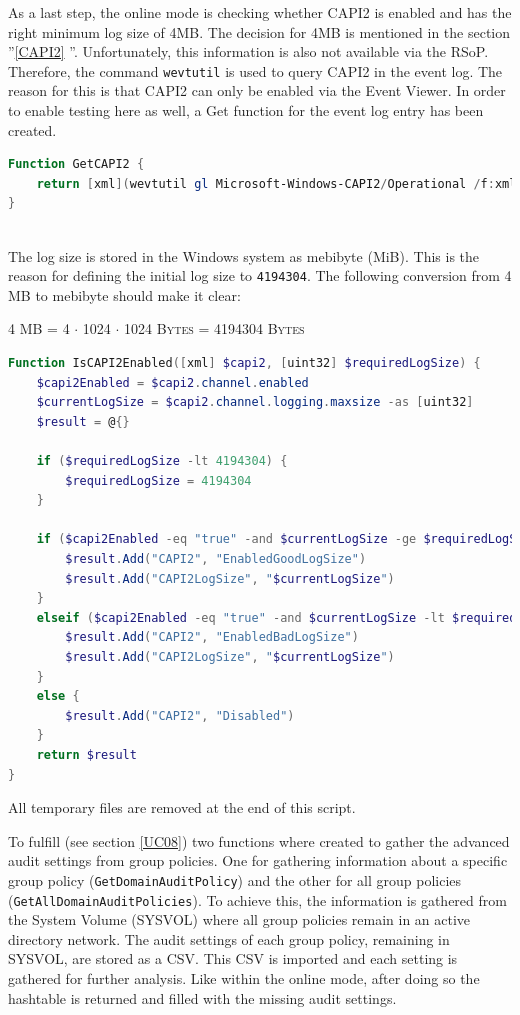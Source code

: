 \clearpage

As a last step, the online mode is checking whether CAPI2 is enabled and has the right minimum log size of 4MB. The decision for 4MB is mentioned in the section ''\ref{CAPI2} ''. Unfortunately, this information is also not available via the RSoP. Therefore, the command \lstinline|wevtutil| is used to query CAPI2 in the event log. The reason for this is that CAPI2 can only be enabled via the Event Viewer. \cite{CAPI2} In order to enable testing here as well, a Get function for the event log entry has been created.

\begin{lstlisting}[caption=Function GetCAPI2, language=PowerShell]
Function GetCAPI2 {
    return [xml](wevtutil gl Microsoft-Windows-CAPI2/Operational /f:xml)
}
\end{lstlisting}\ \\
The log size is stored in the Windows system as mebibyte (MiB). This is the reason for defining the initial log size to \lstinline|4194304|. The following conversion from 4 MB to mebibyte should make it clear:
\begin{center}
    \textsc{4 MB = 4 $\cdot$ 1024 $\cdot$ 1024 Bytes = 4194304 Bytes }
\end{center}
\begin{lstlisting}[caption=Function IsCAPI2Enabled, language=PowerShell]
Function IsCAPI2Enabled([xml] $capi2, [uint32] $requiredLogSize) {
    $capi2Enabled = $capi2.channel.enabled
    $currentLogSize = $capi2.channel.logging.maxsize -as [uint32]
    $result = @{}

    if ($requiredLogSize -lt 4194304) {
        $requiredLogSize = 4194304
    }

    if ($capi2Enabled -eq "true" -and $currentLogSize -ge $requiredLogSize) {
        $result.Add("CAPI2", "EnabledGoodLogSize")
        $result.Add("CAPI2LogSize", "$currentLogSize")
    }
    elseif ($capi2Enabled -eq "true" -and $currentLogSize -lt $requiredLogSize) {
        $result.Add("CAPI2", "EnabledBadLogSize")
        $result.Add("CAPI2LogSize", "$currentLogSize")
    }
    else {
        $result.Add("CAPI2", "Disabled")
    }
    return $result
}  
\end{lstlisting}
All temporary files are removed at the end of this script.
\clearpage

To fulfill  (see section \ref{UC08}) two functions where created to gather the advanced audit settings from group policies. One for gathering information about a specific group policy (\lstinline|GetDomainAuditPolicy|) and the other for all group policies (\lstinline|GetAllDomainAuditPolicies|). To achieve this, the information is gathered from the System Volume (SYSVOL) where all group policies remain in an active directory network. The audit settings of each group policy, remaining in SYSVOL, are stored as a CSV. This CSV is imported and each setting is gathered for further analysis. Like within the online mode, after doing so the hashtable is returned and filled with the missing audit settings. 


